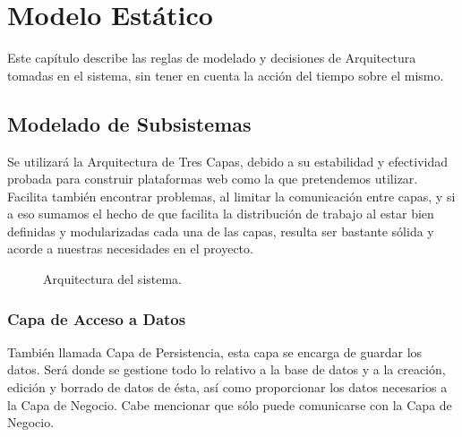 \chapter{Modelo Estático}	
\label{cap:modeloEstatico}

	Este capítulo describe las reglas de modelado y decisiones de Arquitectura tomadas en el sistema, sin tener en cuenta la acción del tiempo sobre el mismo.

\section{Modelado de Subsistemas}

    Se utilizará la Arquitectura de Tres Capas, debido a su estabilidad y efectividad probada para construir plataformas web como la que pretendemos utilizar.
    Facilita también encontrar problemas, al limitar la comunicación entre capas, y si a eso sumamos el hecho de que facilita la distribución de trabajo al estar bien definidas y modularizadas cada una de las capas, resulta ser bastante sólida y acorde a nuestras necesidades en el proyecto.
    
    \begin{figure}[htbp!]
    	\begin{center}
    		\caption{Arquitectura del sistema.}
    		\label{fig:subsistemas}
    	\end{center}
    \end{figure}
    
    \subsection{Capa de Acceso a Datos}
    También llamada Capa de Persistencia, esta capa se encarga de guardar los datos. Será donde se gestione todo lo relativo a la base de datos y a la creación, edición y borrado de datos de ésta, así como proporcionar los datos necesarios a la Capa de Negocio.
    Cabe mencionar que sólo puede comunicarse con la Capa de Negocio.
    
